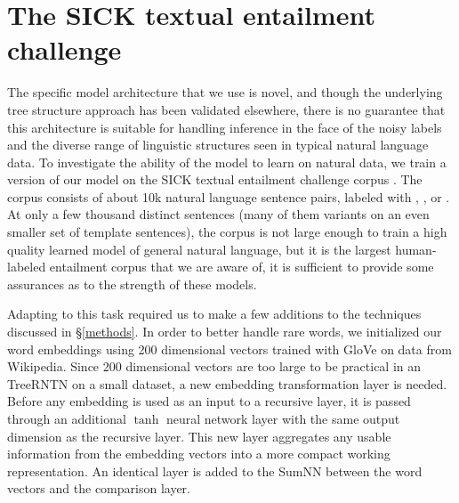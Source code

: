 \section{The SICK textual entailment challenge}\label{sec:sick}

The specific model architecture that we use is novel, and though the underlying tree structure approach has been validated elsewhere, there is no guarantee that this architecture is suitable for handling inference in the face of the noisy labels and the diverse range of linguistic structures seen in typical natural language data. To investigate the ability of the model to learn on natural data, we train a version of our model on the SICK textual entailment challenge corpus \cite{marelli2014sick}. The corpus consists of about 10k natural language sentence pairs, labeled with , , or . At only a few thousand distinct sentences (many of them variants on an even smaller set of template sentences), the corpus is not large enough to train a high quality learned model of general natural language, but it is the largest human-labeled entailment corpus that we are aware of, it is sufficient to provide some assurances as to the strength of these models.

Adapting to this task required us to make a few additions to the techniques discussed in \S\ref{methods}. In order to better handle rare words, we initialized our word embeddings using 200 dimensional vectors trained with 
GloVe \cite{pennington2014glove} on data from Wikipedia. Since 200 dimensional vectors are too large to be practical in an TreeRNTN on a small dataset, a new embedding transformation layer is needed. Before any embedding is used as an input to a recursive layer, it is passed through an additional $\tanh$ neural network layer with the same output dimension as the recursive layer. This new layer aggregates any usable information from the embedding vectors into a more compact working representation. An identical layer is added to the SumNN between the word vectors and the comparison layer.

